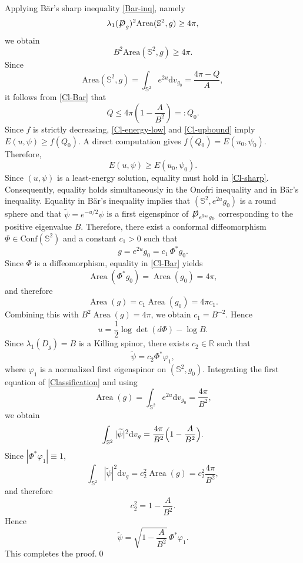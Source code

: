 \documentclass[a4paper, 12pt]{article}
\def\slashiii#1{\setbox0=\hbox{$#1$}#1\hskip-\wd0\hbox to\wd0{\hss\sl/\/\hss}}
\begin{document}
Applying B\"ar's sharp inequality \eqref{Bar-inq}, namely
\[
\lambda_1(\slashiii{D}_g)^2\mathrm{Area}(\mathbb{S}^2,g)\ge 4\pi,
\]
we obtain
\begin{equation}\label{Cl-Bar}
	B^2\mathrm{Area}(\mathbb{S}^2,g)\geq 4\pi.
\end{equation}
Since
\[
\mathrm{Area}(\mathbb{S}^2,g)=\int_{\mathbb{S}^2}e^{2u}{\text{d}}v_{g_0}=\frac{4\pi-Q}{A},
\]
it follows from \eqref{Cl-Bar} that
\begin{equation}\label{Cl-upbound}
	Q\le4\pi\left(	1-\frac{A}{B^2}	\right)=:Q_0.
\end{equation}
Since \(f\) is strictly decreasing, \eqref{Cl-energy-low} and \eqref{Cl-upbound} imply $E(u,\psi)\ge f(Q_0)$. A direct computation gives $f(Q_0)=	E(u_0,\psi_0)$. Therefore,
\begin{equation}\label{Cl-sharp}
	E(u,\psi)\ge E(u_0,\psi_0).
\end{equation}
Since \((u,\psi)\) is a least-energy solution, equality must hold in \eqref{Cl-sharp}. Consequently, equality holds simultaneously in the Onofri inequality and in  B\"ar's inequality. Equality in  B\"ar's inequality implies that \((\mathbb{S}^2,e^{2u}g_0)\) is a round sphere and that $\widetilde\psi=e^{-u/2}\psi$ is a first eigenspinor of \(\slashiii{D}_{e^{2u}g_0}\) corresponding to the positive eigenvalue $B$. Therefore, there exist a conformal diffeomorphism \(\Phi\in\mathrm{Conf}(\mathbb{S}^2)\) and a constant \(c_1>0\) such that
\[
g=e^{2u}g_0=c_1\,\Phi^{*}g_0.
\]
Since \(\Phi\) is a diffeomorphism, equality in \eqref{Cl-Bar} yields
\[
\operatorname{Area}(\Phi^{*}g_0)
=\operatorname{Area}(g_0) =4\pi ,
\]
and therefore
\[
\operatorname{Area}(g)=c_1\operatorname{Area}(g_0) =4\pi c_1.
\]
Combining this with \(B^{2}\operatorname{Area}(g)=4\pi\), we obtain $c_1=B^{-2}$. Hence
\[
u=\frac12\log\det(d\Phi)-\log B.
\]
Since \(\lambda_1(D_g)=B\) is a Killing spinor, there exists \(c_2\in\mathbb R\) such that
\[
\widetilde\psi=c_2\Phi^*\varphi_1,
\]
where \(\varphi_1\) is a normalized first eigenspinor on \((\mathbb{S}^2,g_0)\). Integrating the first equation of \eqref{Classification} and using
\[
\operatorname{Area}(g)
=\int_{\mathbb{S}^2}e^{2u}\text{d}v_{g_0}
=\frac{4\pi}{B^2},
\]
we obtain
\[
\int_{\mathbb{S}^2}|\widetilde\psi|^2\text{d}v_g
=\frac{4\pi}{B^2}\Bigl(1-\frac{A}{B^2}\Bigr).
\]
Since \(|\Phi^*\varphi_1|\equiv1\),
\[
\int_{\mathbb{S}^2}|\widetilde\psi|^2\text{d}v_g=c_2^2\operatorname{Area}(g)
=c_2^2\frac{4\pi}{B^2},
\]
and therefore
\[
c_2^2=1-\frac{A}{B^2}.
\]
Hence
\[
\widetilde\psi=\sqrt{1-\frac{A}{B^2}}\,\Phi^*\varphi_1.
\]
This completes the proof.\qed
\end{document}

